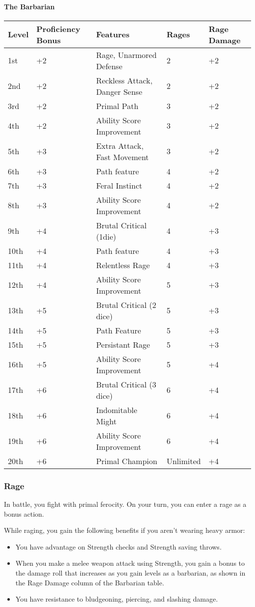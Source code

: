 \documentclass[
]{article}
\providecommand{\tightlist}{%
  \setlength{\itemsep}{0pt}\setlength{\parskip}{0pt}}
\begin{document}
\hypertarget{the-barbarian}{%
\paragraph{The Barbarian}\label{the-barbarian}}

\begin{longtable}[]{@{}lllll@{}}
\toprule
Level & Proficiency Bonus & Features & Rages & Rage
Damage\tabularnewline
\midrule
\endhead
1st & +2 & Rage, Unarmored Defense & 2 & +2\tabularnewline
2nd & +2 & Reckless Attack, Danger Sense & 2 & +2\tabularnewline
3rd & +2 & Primal Path & 3 & +2\tabularnewline
4th & +2 & Ability Score Improvement & 3 & +2\tabularnewline
5th & +3 & Extra Attack, Fast Movement & 3 & +2\tabularnewline
6th & +3 & Path feature & 4 & +2\tabularnewline
7th & +3 & Feral Instinct & 4 & +2\tabularnewline
8th & +3 & Ability Score Improvement & 4 & +2\tabularnewline
9th & +4 & Brutal Critical (1die) & 4 & +3\tabularnewline
10th & +4 & Path feature & 4 & +3\tabularnewline
11th & +4 & Relentless Rage & 4 & +3\tabularnewline
12th & +4 & Ability Score Improvement & 5 & +3\tabularnewline
13th & +5 & Brutal Critical (2 dice) & 5 & +3\tabularnewline
14th & +5 & Path Feature & 5 & +3\tabularnewline
15th & +5 & Persistant Rage & 5 & +3\tabularnewline
16th & +5 & Ability Score Improvement & 5 & +4\tabularnewline
17th & +6 & Brutal Critical (3 dice) & 6 & +4\tabularnewline
18th & +6 & Indomitable Might & 6 & +4\tabularnewline
19th & +6 & Ability Score Improvement & 6 & +4\tabularnewline
20th & +6 & Primal Champion & Unlimited & +4\tabularnewline
\bottomrule
\end{longtable}

\hypertarget{rage}{%
\subsubsection{Rage}\label{rage}}

In battle, you fight with primal ferocity. On your turn, you can enter a
rage as a bonus action.

While raging, you gain the following benefits if you aren't wearing
heavy armor:

\begin{itemize}
\tightlist
\item
  You have advantage on Strength checks and Strength saving throws.
\item
  When you make a melee weapon attack using Strength, you gain a bonus
  to the damage roll that increases as you gain levels as a barbarian,
  as shown in the Rage Damage column of the Barbarian table.
\item
  You have resistance to bludgeoning, piercing, and slashing damage.
\end{itemize}
\end{document}
